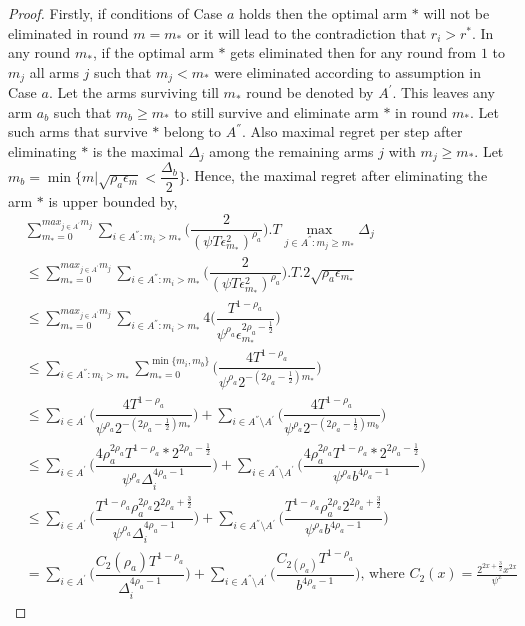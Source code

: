 \begin{proof}
	Firstly, if conditions of Case $a$ holds then the optimal arm ${*}$ will not be eliminated in round $m=m_{*}$ or it will lead to the contradiction that $r_{i}>r^{*}$. In any round $m_{*}$, if the optimal arm ${*}$ gets eliminated then for any round from $1$ to $m_{j}$ all arms ${j}$ such that $m_{j}< m_{*}$ were eliminated according to assumption in Case $a$. Let the arms surviving till $m_{*}$ round be denoted by $A^{'}$. This leaves any arm $a_{b}$ such that $m_{b}\geq m_{*}$ to still survive and eliminate arm ${*}$ in round $m_{*}$. Let such arms that survive ${*}$ belong to $A^{''}$. Also maximal regret per step after eliminating ${*}$ is the maximal $\Delta_{j}$ among the remaining arms ${j}$ with $m_{j}\geq m_{*}$.  Let $m_{b}=\min\lbrace m|\sqrt{\rho_{a}\epsilon_{m}}<\dfrac{\Delta_{b}}{2}\rbrace$. Hence, the maximal regret after eliminating the arm ${*}$ is upper bounded by, 
\begin{align*}
&\sum_{m_{*}=0}^{max_{j\in A^{'}}m_{j}}\sum_{i\in A^{''}:m_{i}>m_{*}}\bigg(\dfrac{2}{(\psi  T\epsilon_{m_{*}}^{2})^{\rho_{a}}} \bigg).T\max_{j\in A^{''}:m_{j}\geq m_{*}}{\Delta}_{j}\\
&\leq\sum_{m_{*}=0}^{max_{j\in A^{'}}m_{j}}\sum_{i\in A^{''}:m_{i}>m_{*}}\bigg(\dfrac{2}{(\psi  T\epsilon_{m_{*}}^{2})^{\rho_{a}}} \bigg).T.2\sqrt{\rho_{a}\epsilon_{m_{*}}}\\
&\leq\sum_{m_{*}=0}^{max_{j\in A^{'}}m_{j}}\sum_{i\in A^{''}:m_{i}>m_{*}}4\bigg(\dfrac{T^{1-\rho_{a}}}{\psi^{\rho_{a}}\epsilon_{m_{*}}^{2\rho_{a}-\frac{1}{2}}} \bigg)\\
&\leq\sum_{i\in A^{''}:m_{i}>m_{*}}\sum_{m_{*}=0}^{\min{\lbrace m_{i},m_{b}\rbrace}}\bigg(\dfrac{4T^{1-\rho_{a}}}{\psi^{\rho_{a}}2^{-(2\rho_{a}-\frac{1}{2})m_{*}}} \bigg)\\
&\leq\sum_{i\in A^{'}}\bigg(\dfrac{4T^{1-\rho_{a}}}{\psi^{\rho_{a}}2^{-(2\rho_{a}-\frac{1}{2})m_{*}}} \bigg)+\sum_{i\in A^{''}\setminus A^{'}}\bigg(\dfrac{4T^{1-\rho_{a}}}{\psi^{\rho_{a}}2^{-(2\rho_{a}-\frac{1}{2})m_{b}}} \bigg)\\
&\leq\sum_{i\in A^{'}}\bigg(\dfrac{4\rho_{a}^{2\rho_{a}}T^{1-\rho_{a}}*2^{2\rho_{a}-\frac{1}{2}}}{\psi^{\rho_{a}}\Delta_{i}^{4\rho_{a}-1}} \bigg)+\sum_{i\in A^{''}\setminus A^{'}}\bigg(\dfrac{4\rho_{a}^{2\rho_{a}}T^{1-\rho_{a}}*2^{2\rho_{a}-\frac{1}{2}}}{\psi^{\rho_{a}}b^{4\rho_{a}-1}} \bigg)\\
&\leq\sum_{i\in A^{'}}\bigg(\dfrac{T^{1-\rho_{a}}\rho_{a}^{2\rho_{a}}2^{2\rho_{a}+\frac{3}{2}}}{\psi^{\rho_{a}}\Delta_{i}^{4\rho_{a}-1}} \bigg)+\sum_{i\in A^{''}\setminus A^{'}}\bigg(\dfrac{T^{1-\rho_{a}}\rho_{a}^{2\rho_{a}}2^{2\rho_{a}+\frac{3}{2}}}{\psi^{\rho_{a}}b^{4\rho_{a}-1}} \bigg)\\
& = \sum_{i\in A^{'}}\bigg(\dfrac{ C_{2}(\rho_{a}) T^{1-\rho_{a}}}{\Delta_{i}^{4\rho_{a}-1}} \bigg)+\sum_{i\in A^{''}\setminus A^{'}}\bigg(\dfrac{C_{2(\rho_{a})}T^{1-\rho_{a}}}{b^{4\rho_{a}-1}} \bigg) \text{, where } C_2(x) = \frac{2^{2x+\frac{3}{2}}x^{2x}}{\psi^{x}}
\end{align*}


\end{proof}
